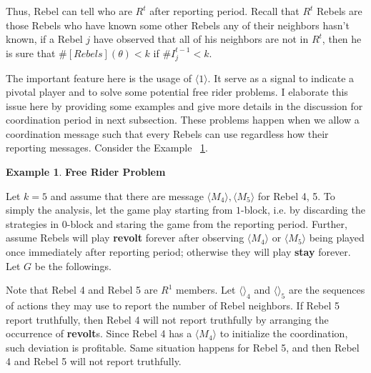 \documentclass[12pt,letter]{article}
\theoremstyle{definition}
\newtheorem{example}{Example}[section]
\theoremstyle{remark}
\theoremstyle{claim}
\begin{document}
Thus, Rebel can tell who are $R^t$ after reporting period. Recall that $R^t$ Rebels are those Rebels who have known some other Rebels any of their neighbors hasn't known, if a Rebel $j$ have observed that all of his neighbors are not in $R^t$, then he is sure that $\#[Rebels](\theta)< k$ if $\#I^{t-1}_j<k$. 

The important feature here is the usage of $\langle 1 \rangle$. It serve as a signal to indicate a pivotal player and to solve some potential free rider problems. I elaborate this issue here by providing some examples and give more details in the discussion for coordination period in next subsection. These problems happen when we allow a coordination message such that every Rebels can use regardless how their reporting messages. Consider the Example ~\ref{ex_free_rider_tree}.

\begin{example} \label{ex_free_rider_tree}\textbf{Free Rider Problem}

Let $k=5$ and assume that there are message $\langle M_4 \rangle,\langle M_5 \rangle$ for Rebel 4, 5. To simply the analysis, let the game play starting from $1$-block, i.e. by discarding the strategies in $0$-block and staring the game from the reporting period. Further, assume Rebels will play \textbf{revolt} forever after observing $\langle M_4 \rangle$ or $\langle M_5 \rangle$ being played once immediately after reporting period; otherwise they will play \textbf{stay} forever. Let $G$ be the followings.

\begin{center}
\end{center}

Note that Rebel 4 and Rebel 5 are $R^1$ members. Let $\langle \rangle_4$ and $\langle \rangle_5$ are the sequences of actions they may use to report the number of Rebel neighbors. If Rebel 5 report truthfully, then Rebel 4 will not report truthfully by arranging the occurrence of \textbf{revolt}s. Since Rebel 4 has a $\langle M_4 \rangle$ to initialize the coordination, such deviation is profitable. Same situation happens for Rebel 5, and then Rebel 4 and Rebel 5 will not report truthfully.

\end{example}
\end{document}
